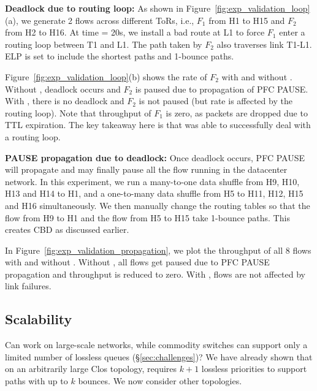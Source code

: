 \textbf{Deadlock due to routing loop:} As shown in
Figure~\ref{fig:exp_validation_loop}(a), we generate 2 flows across different
ToRs, i.e.,  $F_1$ from H1 to H15 and $F_2$ from H2 to H16. At time = 20s, we
install a bad route at L1 to force $F_1$ enter a routing loop between T1 and L1.
The path taken by $F_2$ also traverses link T1-L1.  ELP is set to include the
shortest paths and 1-bounce paths.

Figure~\ref{fig:exp_validation_loop}(b) shows the rate of $F_2$ with and
without \sysname{}. Without \sysname{}, deadlock occurs
and $F_2$ is paused due to propagation of PFC PAUSE. With \sysname{}, there is
no deadlock and $F_2$ is not paused (but rate is affected by the routing loop). Note that
throughput of $F_1$ is zero, as packets are dropped due to TTL expiration.
The key takeaway here is that \sysname{} was able to successfully deal with a
routing loop.

\textbf{PAUSE propagation due to deadlock:} Once deadlock occurs, PFC PAUSE will
propagate and may finally pause all the flow running in the datacenter network.
In this experiment, we run a many-to-one data shuffle from H9, H10, H13 and H14
to H1, and a one-to-many data shuffle from H5 to  H11, H12, H15 and H16
simultaneously. We then manually change the routing tables so that the flow from H9
to H1 and the flow from H5 to H15 take 1-bounce paths. This creates CBD as
discussed earlier.

In Figure~\ref{fig:exp_validation_propagation}, we plot the throughput of all 8
flows with and without \sysname{}. Without \sysname{}, all flows get paused due
to PFC PAUSE propagation and throughput is reduced to zero. With \sysname{},
flows are not affected by link failures.

\subsection{Scalability}
\label{subsec:exp_overhead}

Can \sysname{} work on large-scale networks, while commodity switches can
support only a limited number of lossless queues (\S\ref{sec:challenges})?
We have already shown that on an arbitrarily large Clos
topology, \sysname{} requires $k+1$ lossless priorities to support paths with
up to $k$ bounces. We now consider other topologies.

